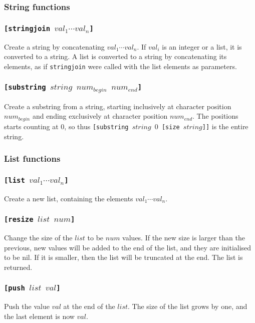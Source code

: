 \documentclass[11pt]{report}
\begin{document}
\subsubsection{String functions}
\subsubsection*{\tt{[stringjoin }$val_1\cdots val_n$\tt{]}}
Create a string by concatenating $val_1\cdots val_n$.
If $val_i$ is an integer or a list, it is converted to a string.
A list is converted to a string by concatenating its elements, as if {\tt stringjoin} were called with the list elements as parameters.

\subsubsection*{\tt{[substring }$string$ $num_{begin}$ $num_{end}$\tt{]}}
Create a substring from a string, starting inclusively at character position $num_{begin}$ and ending exclusively at character position $num_{end}$. The positions starts counting at $0$, so thus {\tt{[substring }$string$ $0$ \tt{[size }$string$\tt{]]}} is the entire string.

\subsubsection{List functions}
\subsubsection*{\tt{[list }$val_1\cdots val_n$\tt{]}}
Create a new list, containing the elements $val_1\cdots val_n$.

\subsubsection*{\tt{[resize }$list$ $num$\tt{]}}
Change the size of the $list$ to be $num$ values. 
If the new size is larger than the previous, new values will be added to the end of the list, and they are initialised to be nil. If it is smaller, then the list will be truncated at the end. The list is returned.

\subsubsection*{\tt{[push }$list$ $val$\tt{]}}
Push the value $val$ at the end of the $list$. The size of the list grows by one, and the last element is now $val$.
\end{document}

